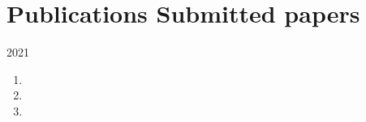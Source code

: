 \section*{Publications {\small Submitted papers}}

\begin{paracol}{2}
  2021
\switchcolumn
  \begin{enumerate}
    \item {}
    \item {}
    \item {}
    \setcounter{pubcounter}{\theenumi}
  \end{enumerate}
\end{paracol}